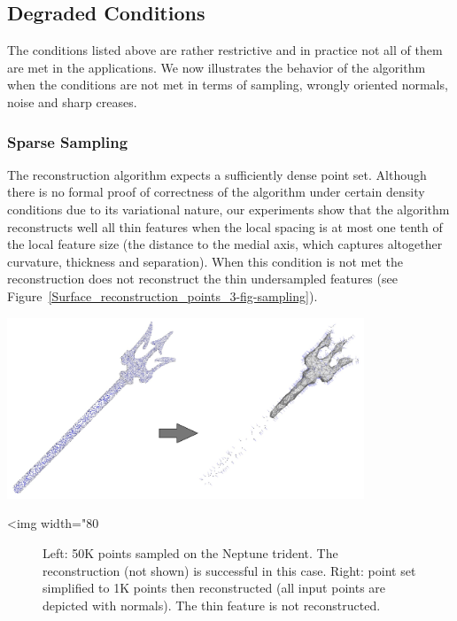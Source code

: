 \subsection{Degraded Conditions}

The conditions listed above are rather restrictive and in practice not all of them are met in the applications. We now illustrates the behavior of the algorithm when the conditions are not met in terms of sampling, wrongly oriented normals, noise and sharp creases.

\subsubsection{Sparse Sampling}

The reconstruction algorithm expects a sufficiently dense point set. Although there is no formal proof of correctness of the algorithm under certain density conditions due to its variational nature, our experiments show that the algorithm reconstructs well all thin features when the local spacing is at most one tenth of the local feature size (the distance to the medial axis, which captures altogether curvature, thickness and separation). When this condition is not met the reconstruction does not reconstruct the thin undersampled features (see Figure~\ref{Surface_reconstruction_points_3-fig-sampling}).

\begin{center}
    \label{Surface_reconstruction_points_3-fig-sampling}
    \begin{ccTexOnly}
\includegraphics[width=0.8\textwidth]{Surface_reconstruction_points_3/sampling}     \end{ccTexOnly}
    \begin{ccHtmlOnly}
        <img width="80%
    \end{ccHtmlOnly}
    \begin{figure}[h]
        \caption{Left: 50K points sampled on the Neptune trident.
                 The reconstruction (not shown) is successful in this case.
                 Right: point set simplified to 1K points then reconstructed
                 (all input points are depicted with normals). The thin
                 feature is not reconstructed.}
    \end{figure}
\end{center}


